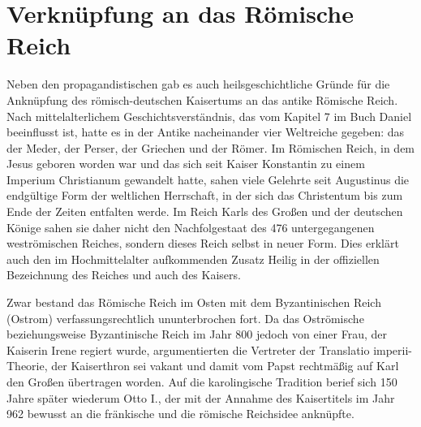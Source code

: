 \section{Verknüpfung an das Römische Reich}

Neben den propagandistischen gab es auch heilsgeschichtliche Gründe für die Anknüpfung des römisch-deutschen Kaisertums an das antike Römische Reich. Nach mittelalterlichem Geschichtsverständnis, das vom Kapitel 7 im Buch Daniel beeinflusst ist, hatte es in der Antike nacheinander vier Weltreiche gegeben: das der Meder, der Perser, der Griechen und der Römer. Im Römischen Reich, in dem Jesus geboren worden war und das sich seit Kaiser Konstantin zu einem Imperium Christianum gewandelt hatte, sahen viele Gelehrte seit Augustinus die endgültige Form der weltlichen Herrschaft, in der sich das Christentum bis zum Ende der Zeiten entfalten werde. Im Reich Karls des Großen und der deutschen Könige sahen sie daher nicht den Nachfolgestaat des 476 untergegangenen weströmischen Reiches, sondern dieses Reich selbst in neuer Form. Dies erklärt auch den im Hochmittelalter aufkommenden Zusatz Heilig in der offiziellen Bezeichnung des Reiches und auch des Kaisers.

Zwar bestand das Römische Reich im Osten mit dem Byzantinischen Reich (Ostrom) verfassungsrechtlich ununterbrochen fort. Da das Oströmische beziehungsweise Byzantinische Reich im Jahr 800 jedoch von einer Frau, der Kaiserin Irene regiert wurde, argumentierten die Vertreter der Translatio imperii-Theorie, der Kaiserthron sei vakant und damit vom Papst rechtmäßig auf Karl den Großen übertragen worden. Auf die karolingische Tradition berief sich 150 Jahre später wiederum Otto I., der mit der Annahme des Kaisertitels im Jahr 962 bewusst an die fränkische und die römische Reichsidee anknüpfte.

